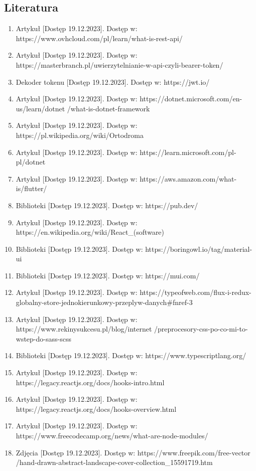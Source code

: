 \documentclass[a4paper,twoside,12pt]{book}
\begin{document}
\begin{appendices}
\chapter{Literatura}
\begin{enumerate}
    \item Artykuł [Dostęp 19.12.2023]. Dostęp w: https://www.ovhcloud.com/pl/learn/what-is-rest-api/ 
    \item Artykuł [Dostęp 19.12.2023]. Dostęp w: https://masterbranch.pl/uwierzytelnianie-w-api-czyli-bearer-token/ 
    \item Dekoder tokenu [Dostęp 19.12.2023]. Dostęp w: https://jwt.io/ 
    \item Artykuł [Dostęp 19.12.2023]. Dostęp w: https://dotnet.microsoft.com/en-us/learn/dotnet /what-is-dotnet-framework
    \item Artykuł [Dostęp 19.12.2023]. Dostęp w: https://pl.wikipedia.org/wiki/Ortodroma 
    \item Artykuł [Dostęp 19.12.2023]. Dostęp w: https://learn.microsoft.com/pl-pl/dotnet
    \item Artykuł [Dostęp 19.12.2023]. Dostęp w: https://aws.amazon.com/what-is/flutter/
    \item Biblioteki [Dostęp 19.12.2023]. Dostęp w: https://pub.dev/
    \item Artykuł [Dostęp 19.12.2023]. Dostęp w: https://en.wikipedia.org/wiki/React\_(software)
    \item Biblioteki [Dostęp 19.12.2023]. Dostęp w: https://boringowl.io/tag/material-ui
    \item Biblioteki [Dostęp 19.12.2023]. Dostęp w: https://mui.com/
    \item Artykuł [Dostęp 19.12.2023]. Dostęp w: https://typeofweb.com/flux-i-redux-globalny-store-jednokierunkowy-przeplyw-danych\#fnref-3
    \item Artykuł [Dostęp 19.12.2023]. Dostęp w: https://www.rekinysukcesu.pl/blog/internet /preprocesory-css-po-co-mi-to-wstep-do-sass-scss
    \item Biblioteki [Dostęp 19.12.2023]. Dostęp w: https://www.typescriptlang.org/
    \item Artykuł [Dostęp 19.12.2023]. Dostęp w: https://legacy.reactjs.org/docs/hooks-intro.html
    \item Artykuł [Dostęp 19.12.2023]. Dostęp w: https://legacy.reactjs.org/docs/hooks-overview.html
    \item Artykuł [Dostęp 19.12.2023]. Dostęp w: https://www.freecodecamp.org/news/what-are-node-modules/
    \item Zdjęcia [Dostęp 19.12.2023]. Dostęp w: https://www.freepik.com/free-vector /hand-drawn-abstract-landscape-cover-collection\_15591719.htm

\end{enumerate}
\end{appendices}
\end{document}
